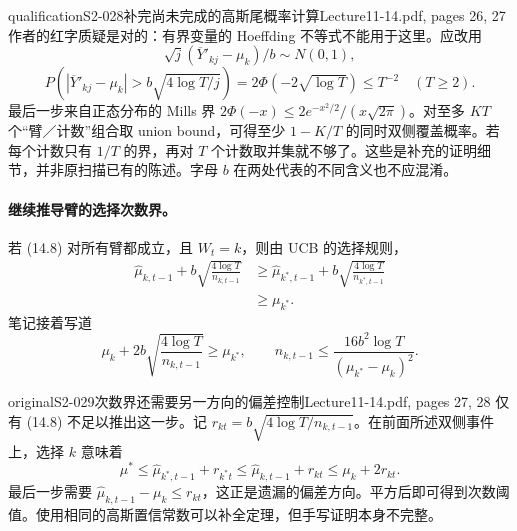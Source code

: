 \begin{reviewnote}{qualification}{S2-028}{补完尚未完成的高斯尾概率计算}{Lecture11-14.pdf, pages 26, 27}
作者的红字质疑是对的：有界变量的 Hoeffding 不等式不能用于这里。应改用
\[
 \sqrt j(\overline Y'_{kj}-\mu_k)/b\sim N(0,1),
\]
\[
 P\left(|\overline Y'_{kj}-\mu_k|>b\sqrt{4\log T/j}\right)
 =2\Phi(-2\sqrt{\log T})\le T^{-2}\quad(T\ge2).
\]
最后一步来自正态分布的 Mills 界 $2\Phi(-x)\le2e^{-x^2/2}/(x\sqrt{2\pi})$。对至多 $KT$ 个“臂／计数”组合取 union bound，可得至少 $1-K/T$ 的同时双侧覆盖概率。若每个计数只有 $1/T$ 的界，再对 $T$ 个计数取并集就不够了。这些是补充的证明细节，并非原扫描已有的陈述。字母 $b$ 在两处代表的不同含义也不应混淆。
\end{reviewnote}


\paragraph{继续推导臂的选择次数界。}
若 (14.8) 对所有臂都成立，且 $W_t=k$，则由 UCB 的选择规则，
\begin{align*}
 \widehat\mu_{k,t-1}+b\sqrt{\frac{4\log T}{n_{k,t-1}}}
 &\ge\widehat\mu_{k^*,t-1}+b\sqrt{\frac{4\log T}{n_{k^*,t-1}}}\\
 &\ge\mu_{k^*}.
\end{align*}
笔记接着写道
\[
 \mu_k+2b\sqrt{\frac{4\log T}{n_{k,t-1}}}\ge\mu_{k^*},
 \qquad
 n_{k,t-1}\le\frac{16b^2\log T}{(\mu_{k^*}-\mu_k)^2}.
\]

\begin{reviewnote}{original}{S2-029}{次数界还需要另一方向的偏差控制}{Lecture11-14.pdf, pages 27, 28}
仅有 (14.8) 不足以推出这一步。记 $r_{kt}=b\sqrt{4\log T/n_{k,t-1}}$。在前面所述双侧事件上，选择 $k$ 意味着
\[
 \mu^*\le\widehat\mu_{k^*,t-1}+r_{k^*t}
 \le\widehat\mu_{k,t-1}+r_{kt}\le\mu_k+2r_{kt}.
\]
最后一步需要 $\widehat\mu_{k,t-1}-\mu_k\le r_{kt}$，这正是遗漏的偏差方向。平方后即可得到次数阈值。使用相同的高斯置信常数可以补全定理，但手写证明本身不完整。
\end{reviewnote}




